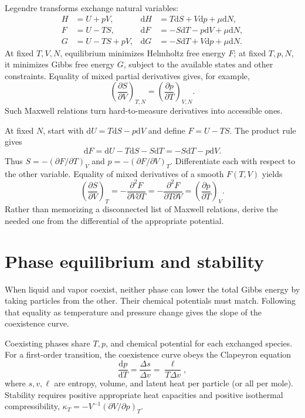 \documentclass[11pt,oneside]{book}
\newcommand{\dd}{\mathrm{d}}
\newcommand{\pd}[2]{\frac{\partial #1}{\partial #2}}
\newcommand{\od}[2]{\frac{\dd #1}{\dd #2}}
\theoremstyle{reviewstyle}
\begin{document}
Legendre transforms exchange natural variables:
\begin{align}
H&=U+pV,&\dd H&=T\dd S+V\dd p+\mu\dd N,\\
F&=U-TS,&\dd F&=-S\dd T-p\dd V+\mu\dd N,\\
G&=U-TS+pV,&\dd G&=-S\dd T+V\dd p+\mu\dd N.
\end{align}
At fixed $T,V,N$, equilibrium minimizes Helmholtz free energy $F$; at fixed $T,p,N$, it minimizes Gibbs free energy $G$, subject to the available states and other constraints. Equality of mixed partial derivatives gives, for example,
\begin{equation}\left(\pd{S}{V}\right)_{T,N}=\left(\pd{p}{T}\right)_{V,N}.\end{equation}
Such Maxwell relations turn hard-to-measure derivatives into accessible ones.

At fixed $N$, start with $\dd U=T\dd S-p\dd V$ and define $F=U-TS$. The product rule gives
\begin{equation}
\dd F=\dd U-T\dd S-S\dd T=-S\dd T-p\dd V.
\end{equation}
Thus $S=-(\partial F/\partial T)_V$ and $p=-(\partial F/\partial V)_T$. Differentiate each with respect to the other variable. Equality of mixed derivatives of a smooth $F(T,V)$ yields
\begin{equation}
\left(\pd SV\right)_T=-\frac{\partial^2F}{\partial V\partial T}
=-\frac{\partial^2F}{\partial T\partial V}
=\left(\pd pT\right)_V.
\end{equation}
Rather than memorizing a disconnected list of Maxwell relations, derive the needed one from the differential of the appropriate potential.

\section{Phase equilibrium and stability}
When liquid and vapor coexist, neither phase can lower the total Gibbs energy by taking particles from the other. Their chemical potentials must match. Following that equality as temperature and pressure change gives the slope of the coexistence curve.

Coexisting phases share $T,p$, and chemical potential for each exchanged species. For a first-order transition, the coexistence curve obeys the Clapeyron equation
\begin{equation}\od{p}{T}=\frac{\Delta s}{\Delta v}=\frac{\ell}{T\Delta v},\end{equation}
where $s,v,\ell$ are entropy, volume, and latent heat per particle (or all per mole). Stability requires positive appropriate heat capacities and positive isothermal compressibility,
$\kappa_T=-V^{-1}(\partial V/\partial p)_T$.
\end{document}
